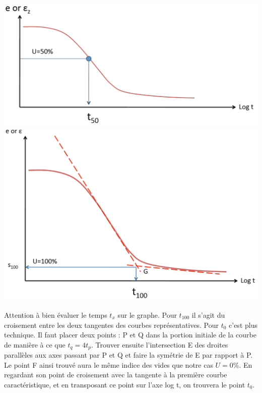     \begin{multicols}{2}
        \includegraphics[scale=0.4]{Verastegui/images/V4.PNG}
        \vfill\null\columnbreak
        \includegraphics[scale=0.3]{Verastegui/images/V5.PNG} \\
    \end{multicols}
    
    \medskip
    Attention à bien évaluer le temps $t_x$ sur le graphe. Pour $t_{100}$ il s'agit du croisement entre les deux tangentes des courbes représentatives. Pour $t_0$ c'est plus technique. Il faut placer deux points : P et Q dans la portion initiale de la courbe de manière à ce que $t_q = 4 t_p$. Trouver ensuite l'intersection E des droites parallèles aux axes passant par P et Q et faire la symétrie de E par rapport à P. Le point F ainsi trouvé aura le même indice des vides que notre cas $U = 0\%$. En regardant son point de croisement avec la tangente à la première courbe caractéristique, et en transposant ce point sur l'axe log t, on trouvera le point $t_0$. \\
    

